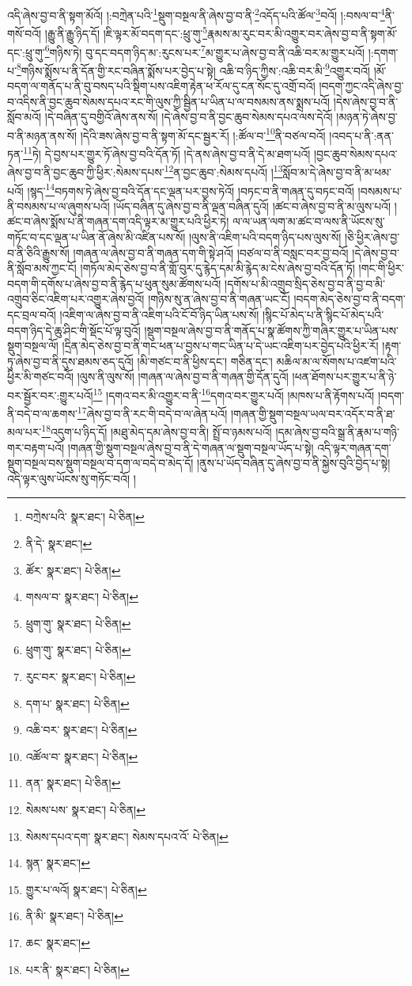 འདི་ཞེས་བྱ་བ་ནི་སྟག་མོའོ། །:བཀྲེན་པའི་\footnote{བཀྲེས་པའི་  སྣར་ཐང་།  པེ་ཅིན། }སྡུག་བསྔལ་ནི་ཞེས་བྱ་བ་ནི་\footnote{ནི་དེ་  སྣར་ཐང་། }འདོད་པའི་ཚོལ་\footnote{ཚོར་  སྣར་ཐང་།  པེ་ཅིན། }བའོ། །:བསལ་བ་\footnote{གསལ་བ་  སྣར་ཐང་།  པེ་ཅིན། }ནི་གསོ་བའོ། །རྒྱུ་ནི་རྒྱུ་ཉིད་དོ། །ཇི་ལྟར་མོ་བདག་དང་:ཕྲུ་གུ་\footnote{ཕྲུག་གུ་  སྣར་ཐང་།  པེ་ཅིན། }རྣམས་མ་རུང་བར་མི་འགྱུར་བར་ཞེས་བྱ་བ་ནི་སྟག་མོ་དང་:ཕྲུ་གུ་\footnote{ཕྲུག་གུ་  སྣར་ཐང་།  པེ་ཅིན། }གཉིས་ཏེ། བུ་དང་བདག་ཉིད་མ་:རུངས་པར་\footnote{རུང་བར་  སྣར་ཐང་།  པེ་ཅིན། }མ་གྱུར་པ་ཞེས་བྱ་བ་ནི་འཆི་བར་མ་གྱུར་པའོ། །:དགག་པ་\footnote{དག་པ་  སྣར་ཐང་།  པེ་ཅིན། }གཉིས་སྨོས་པ་ནི་དོན་གྱི་རང་བཞིན་སྨོས་པར་བྱེད་པ་སྟེ། འཆི་བ་ཉིད་ཀྱིས་:འཆི་བར་མི་\footnote{འཆི་བར་  སྣར་ཐང་།  པེ་ཅིན། }འགྱུར་བའོ། །མོ་བདག་ལ་གནོད་པ་ནི་བུ་བསད་པའི་སྡིག་པས་འཇིག་རྟེན་ཕ་རོལ་དུ་ངན་སོང་དུ་འགྲོ་བའོ། །བདག་ཀྱང་འདི་ཞེས་བྱ་བ་འདིས་ནི་བྱང་ཆུབ་སེམས་དཔའ་རང་གི་ལུས་ཀྱི་སྦྱིན་པ་ཡིན་པ་ལ་བསམས་ནས་སྨྲས་པའོ། །དེས་ཞེས་བྱ་བ་ནི་སློབ་མའོ། །དེ་བཞིན་དུ་བགྱིའོ་ཞེས་ནས་སོ། །དེ་ཞེས་བྱ་བ་ནི་བྱང་ཆུབ་སེམས་དཔའ་ལས་དེའོ། །མཉན་ཏེ་ཞེས་བྱ་བ་ནི་མཉན་ནས་སོ། །དེའི་ཟས་ཞེས་བྱ་བ་ནི་སྟག་མོ་དང་སྦྱར་རོ། །:ཚོལ་བ་\footnote{འཚོལ་བ་  སྣར་ཐང་།  པེ་ཅིན། }ནི་བཙལ་བའོ། །འབད་པ་ནི་:ནན་ཏན་\footnote{ནན་  སྣར་ཐང་།  པེ་ཅིན། }ཏེ། དེ་བྱས་པར་གྱུར་ཏོ་ཞེས་བྱ་བའི་དོན་ཏོ། །དེ་ནས་ཞེས་བྱ་བ་ནི་དེ་མ་ཐག་པའོ། །བྱང་ཆུབ་སེམས་དཔའ་ཞེས་བྱ་བ་ནི་བྱང་ཆུབ་ཀྱི་ཕྱིར་:སེམས་དཔས་\footnote{སེམས་པས་  སྣར་ཐང་།  པེ་ཅིན། }ན་བྱང་ཆུབ་:སེམས་དཔའོ། །\footnote{སེམས་དཔའ་དག་  སྣར་ཐང་། སེམས་དཔའ་འོ་  པེ་ཅིན། }སློབ་མ་དེ་ཞེས་བྱ་བ་ནི་མ་ཕམ་པའོ། །སྙད་\footnote{སྙན་  སྣར་ཐང་། }བཏགས་ཏེ་ཞེས་བྱ་བའི་དོན་དང་ལྡན་པར་བྱས་ཏེའོ། །བཏང་བ་ནི་གཞན་དུ་བཏང་བའོ། །བསམས་པ་ནི་བསམས་པ་ལ་ཞུགས་པའོ། །ཡོད་བཞིན་དུ་ཞེས་བྱ་བ་ནི་ལྡན་བཞིན་དུའོ། །ཚང་བ་ཞེས་བྱ་བ་ནི་མ་ལུས་པའོ། །ཚང་བ་ཞེས་སྨོས་པ་ནི་གཞན་དག་འདི་ལྟར་མ་གྱུར་པའི་ཕྱིར་ཏེ། ལ་ལ་ཡན་ལག་མ་ཚང་བ་ལས་ནི་ཡོངས་སུ་གཏོང་བ་དང་ལྡན་པ་ཡིན་ནོ་ཞེས་མི་འཛིན་པས་སོ། །ལུས་ནི་འཇིག་པའི་བདག་ཉིད་པས་ལུས་སོ། །ཅི་ཕྱིར་ཞེས་བྱ་བ་ནི་ཅིའི་རྒྱུས་སོ། །གཞན་ལ་ཞེས་བྱ་བ་ནི་གཞན་དག་གི་སྟེ་ཤའོ། །བཙལ་བ་ནི་བསླང་བར་བྱ་བའོ། །དེ་ཞེས་བྱ་བ་ནི་སློབ་མས་ཀྱང་ངོ། །གཏོལ་མེད་ཅེས་བྱ་བ་ནི་གློ་བུར་དུ་རྙེད་དམ་མི་རྙེད་མ་ངེས་ཞེས་བྱ་བའི་དོན་ཏོ། །གང་གི་ཕྱིར་བདག་གི་དགོས་པ་ཞེས་བྱ་བ་ནི་རྙེད་པ་ཕུན་སུམ་ཚོགས་པའོ། །དགོས་པ་མི་འགྲུབ་སྲིད་ཅེས་བྱ་བ་ནི་བྱ་བ་མི་འགྲུབ་ཅིང་འཇིག་པར་འགྱུར་ཞེས་བྱའོ། །གཉིས་སུ་ན་ཞེས་བྱ་བ་ནི་གཞན་ཡང་ངོ། །བདག་མེད་ཅེས་བྱ་བ་ནི་བདག་དང་བྲལ་བའོ། །འཇིག་ལ་ཞེས་བྱ་བ་ནི་འཇིག་པའི་ངོ་བོ་ཉིད་ཡིན་པས་སོ། །སྙིང་པོ་མེད་པ་ནི་སྙིང་པོ་མེད་པའི་བདག་ཉིད་དེ་ཆུ་ཤིང་གི་སྡོང་པོ་ལྟ་བུའོ། །སྡུག་བསྔལ་ཞེས་བྱ་བ་ནི་གནོད་པ་སྣ་ཚོགས་ཀྱི་གཞིར་གྱུར་པ་ཡིན་པས་སྡུག་བསྔལ་ལོ། །དྲིན་མེད་ཅེས་བྱ་བ་ནི་གང་ཕན་པ་བྱས་པ་གང་ཡིན་པ་དེ་ཡང་འཇིག་པར་བྱེད་པའི་ཕྱིར་རོ། །རྟག་ཏུ་ཞེས་བྱ་བ་ནི་དུས་ཐམས་ཅད་དུའོ། །མི་གཙང་བ་ནི་ཕྱིས་དང་། གཅིན་དང་། མཆིལ་མ་ལ་སོགས་པ་འཛག་པའི་ཕྱིར་མི་གཙང་བའོ། །ལུས་ནི་ལུས་སོ། །གཞན་ལ་ཞེས་བྱ་བ་ནི་གཞན་གྱི་དོན་དུའོ། །ཕན་ཐོགས་པར་གྱུར་པ་ནི་ཉེ་བར་སྦྱོར་བར་:གྱུར་པའོ།\footnote{གྱུར་པ་ལའོ།  སྣར་ཐང་།  པེ་ཅིན། } །དགའ་བར་མི་འགྱུར་བ་ནི་\footnote{ནི་མི་  སྣར་ཐང་།  པེ་ཅིན། }དགའ་བར་གྱུར་པའོ། །མཁས་པ་ནི་རྟོགས་པའོ། །བདག་ནི་བདེ་བ་ལ་ཆགས་\footnote{ཆང་  སྣར་ཐང་། }ཞེས་བྱ་བ་ནི་རང་གི་བདེ་བ་ལ་ཞེན་པའོ། །གཞན་གྱི་སྡུག་བསྔལ་ཡལ་བར་འདོར་བ་ནི་ཐ་མལ་པར་\footnote{པར་ནི་  སྣར་ཐང་།  པེ་ཅིན། }འདུག་པ་ཉིད་དོ། །མཐུ་མེད་དམ་ཞེས་བྱ་བ་ནི། སྤྲོ་བ་ཉམས་པའོ། །དམ་ཞེས་བྱ་བའི་སྒྲ་ནི་རྣམ་པ་གཉི་གར་བརྟག་པའོ། །གཞན་གྱི་སྡུག་བསྔལ་ཞེས་བྱ་བ་ནི་དེ་གཞན་ལ་སྡུག་བསྔལ་ཡོད་པ་སྟེ། འདི་ལྟར་གཞན་དག་སྡུག་བསྔལ་བས་སྡུག་བསྔལ་བ་དག་ལ་བདེ་བ་མེད་དོ། །ནུས་པ་ཡོད་བཞིན་དུ་ཞེས་བྱ་བ་ནི་སྐྱེས་བུའི་བྱེད་པ་སྟེ། འདི་ལྟར་ལུས་ཡོངས་སུ་གཏོང་བའོ། །
